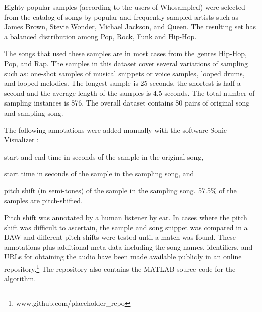 \documentclass{article}
\begin{document}

Eighty popular samples (according to the users of Whosampled) were selected from the catalog of songs by popular and frequently sampled artists such as James Brown, Stevie Wonder, Michael Jackson, and Queen. The resulting set has a balanced distribution among Pop, Rock, Funk and Hip-Hop.

    The songs that used these samples are in most cases from the genres Hip-Hop, Pop, and Rap. The samples in this dataset cover several variations of sampling such as: one-shot samples of musical snippets or voice samples, looped drums, and looped melodies. The longest sample is 25 seconds, the shortest is half a second and the average length of the samples is 4.5 seconds. The total number of sampling instances is 876. %
The overall dataset contains 80 pairs of original song and sampling song.

The following annotations were added manually with the software Sonic Visualizer \cite{SonicVisualiser}:
\begin{inparaenum}[(i)]
    \item   start and end time in seconds of the sample in the original song,
    \item   start time in seconds of the sample in the sampling song, and
    \item   pitch shift (in semi-tones) of the sample in the sampling song. 57.5\% of the samples are pitch-shifted.
\end{inparaenum}
Pitch shift was annotated by a human listener by ear. In cases where the pitch shift was difficult to ascertain, the sample and song snippet was compared in a DAW and different pitch shifts were tested until a match was found.
These annotations plus additional meta-data including the song names, identifiers, and URLs for obtaining the audio have been made available publicly in an online repository.\footnote{www.github.com/placeholder\_repo} The repository also contains the MATLAB source code for the algorithm. 
\end{document}
